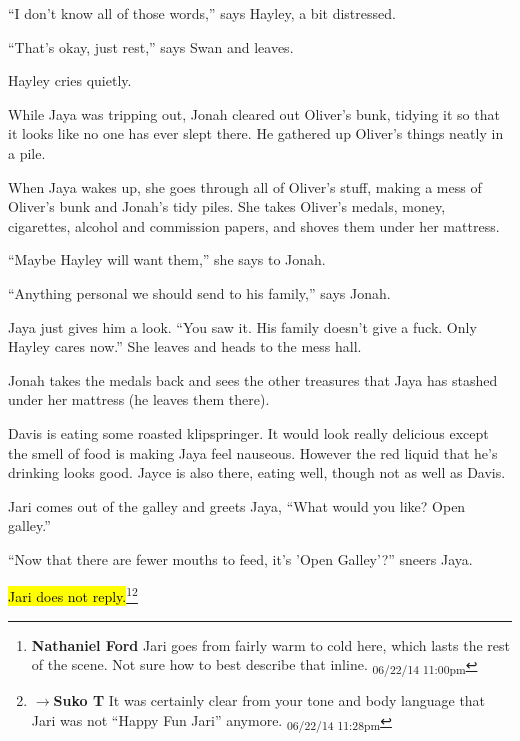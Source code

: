 ``I don't know all of those words,'' says Hayley, a bit distressed.

``That's okay, just rest,'' says Swan and leaves.

Hayley cries quietly.





While Jaya was tripping out, Jonah cleared out Oliver's bunk, tidying it so that it looks like no one has ever slept there.  He gathered up Oliver's things neatly in a pile.



When Jaya wakes up, she goes through all of Oliver's stuff, making a mess of Oliver's bunk and Jonah's tidy piles.  She takes Oliver's medals, money, cigarettes, alcohol and commission papers, and shoves them under her mattress.

``Maybe Hayley will want them,'' she says to Jonah.

``Anything personal we should send to his family,'' says Jonah.

Jaya just gives him a look.  ``You saw it.  His family doesn't give a fuck.  Only Hayley cares now.''  She leaves and heads to the mess hall.



Jonah takes the medals back and sees the other treasures that Jaya has stashed under her mattress (he leaves them there).





Davis is eating some roasted klipspringer.  It would look really delicious except the smell of food is making Jaya feel nauseous.  However the red liquid that he's drinking looks good.  Jayce is also there, eating well, though not as well as Davis.



Jari comes out of the galley and greets Jaya, ``What would you like?  Open galley.''

``Now that there are fewer mouths to feed, it's 'Open Galley'?'' sneers Jaya.

\hl{Jari does not reply.}\footnote{\textbf{Nathaniel Ford }Jari goes from fairly warm to cold here, which lasts the rest of the scene. Not sure how to best describe that inline. \textsubscript{06/22/14 11:00pm}}\footnote{$\rightarrow$\textbf{Suko T }It was certainly clear from your tone and body language that Jari was not ``Happy Fun Jari'' anymore. \textsubscript{06/22/14 11:28pm}}


